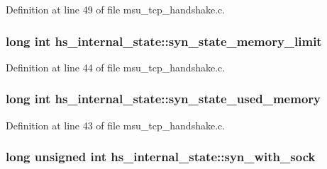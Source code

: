 Definition at line 49 of file msu\-\_\-tcp\-\_\-handshake.\-c.

\hypertarget{strucths__internal__state_a76e2d5d1ad49e970f4249d983aaabd64}{
\subsubsection[{syn\-\_\-state\-\_\-memory\-\_\-limit}]{\setlength{\rightskip}{0pt plus 5cm}long int hs\-\_\-internal\-\_\-state\-::syn\-\_\-state\-\_\-memory\-\_\-limit}}\label{strucths__internal__state_a76e2d5d1ad49e970f4249d983aaabd64}


Definition at line 44 of file msu\-\_\-tcp\-\_\-handshake.\-c.

\hypertarget{strucths__internal__state_a422634ae83899c2dca101dbb187d61bd}{
\subsubsection[{syn\-\_\-state\-\_\-used\-\_\-memory}]{\setlength{\rightskip}{0pt plus 5cm}long int hs\-\_\-internal\-\_\-state\-::syn\-\_\-state\-\_\-used\-\_\-memory}}\label{strucths__internal__state_a422634ae83899c2dca101dbb187d61bd}


Definition at line 43 of file msu\-\_\-tcp\-\_\-handshake.\-c.

\hypertarget{strucths__internal__state_afc7c3c0bc8530436594739f8f68dcdfa}{
\subsubsection[{syn\-\_\-with\-\_\-sock}]{\setlength{\rightskip}{0pt plus 5cm}long unsigned int hs\-\_\-internal\-\_\-state\-::syn\-\_\-with\-\_\-sock}}\label{strucths__internal__state_afc7c3c0bc8530436594739f8f68dcdfa}



